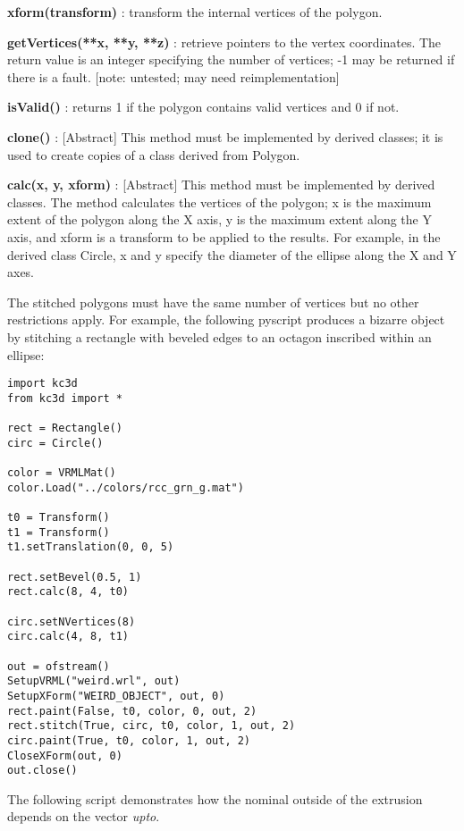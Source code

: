 \documentclass[a4paper, dvipdfm]{article}
\begin{document}
\textbf{xform(transform)} : transform the internal vertices of the polygon.

\textbf{getVertices(**x, **y, **z)} : retrieve pointers to the vertex coordinates.
The return value is an integer specifying the number of vertices; -1 may be returned
if there is a fault. [note: untested; may need reimplementation]

\textbf{isValid()} : returns 1 if the polygon contains valid vertices and 0 if not.

\textbf{clone()} : [Abstract] This method must be implemented by derived classes;
it is used to create copies of a class derived from Polygon.

\textbf{calc(x, y, xform)} : [Abstract] This method must be implemented by derived
classes. The method calculates the vertices of the polygon; x is the
maximum extent of the polygon along the X axis, y is the maximum extent
along the Y axis, and xform is a transform to be applied to the results.
For example, in the derived class Circle, x and y specify the diameter
of the ellipse along the X and Y axes.

The stitched polygons must have the same number of vertices but no other restrictions
apply.  For example, the following pyscript produces a bizarre object by stitching a
rectangle with beveled edges to an octagon inscribed within an ellipse:

\begin{verbatim}
import kc3d
from kc3d import *

rect = Rectangle()
circ = Circle()

color = VRMLMat()
color.Load("../colors/rcc_grn_g.mat")

t0 = Transform()
t1 = Transform()
t1.setTranslation(0, 0, 5)

rect.setBevel(0.5, 1)
rect.calc(8, 4, t0)

circ.setNVertices(8)
circ.calc(4, 8, t1)

out = ofstream()
SetupVRML("weird.wrl", out)
SetupXForm("WEIRD_OBJECT", out, 0)
rect.paint(False, t0, color, 0, out, 2)
rect.stitch(True, circ, t0, color, 1, out, 2)
circ.paint(True, t0, color, 1, out, 2)
CloseXForm(out, 0)
out.close()
\end{verbatim}

The following script demonstrates how the nominal outside of the
extrusion depends on the vector \emph{upto}.
\end{document}
